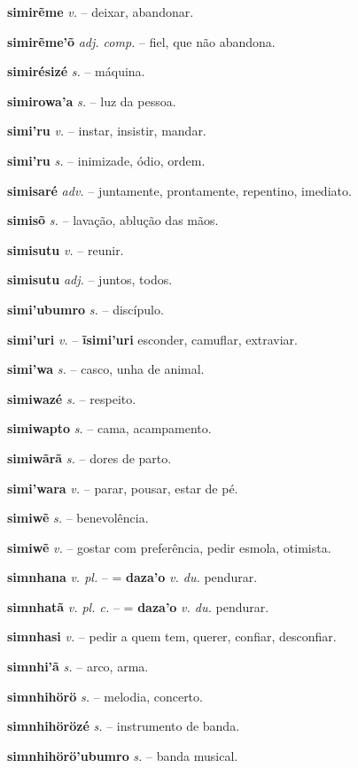 \textbf{simirẽme} \textit{v.} -- deixar, abandonar.

\textbf{simirẽme'õ} \textit{adj. comp.} -- fiel, que não abandona.

\textbf{simirésizé} \textit{s.} -- máquina.

\textbf{simirowa'a} \textit{s.} -- luz da pessoa.

\textbf{simi'ru} \textit{v.} -- instar, insistir, mandar.

\textbf{simi'ru} \textit{s.} -- inimizade, ódio, ordem.

\textbf{simisaré} \textit{adv.} -- juntamente, prontamente, repentino, imediato.

\textbf{simisõ} \textit{s.} -- lavação, ablução das mãos.

\textbf{simisutu} \textit{v.} -- reunir.

\textbf{simisutu} \textit{adj.} -- juntos, todos.

\textbf{simi'ubumro} \textit{s.} -- discípulo.

\textbf{simi'uri} \textit{v.} -- \textbf{ĩsimi'uri} esconder, camuflar, extraviar.

\textbf{simi'wa} \textit{s.} -- casco, unha de animal.

\textbf{simiwazé} \textit{s.} -- respeito.

\textbf{simiwapto} \textit{s.} -- cama, acampamento.

\textbf{simiwãrã} \textit{s.} -- dores de parto.

\textbf{simi'wara} \textit{v.} -- parar, pousar, estar de pé.

\textbf{simiwẽ} \textit{s.} -- benevolência.

\textbf{simiwẽ} \textit{v.} -- gostar com preferência, pedir esmola, otimista.

\textbf{simnhana} \textit{v. pl.} -- = \textbf{daza'o} \textit{v. du.} pendurar.

\textbf{simnhatã} \textit{v. pl. c.} -- = \textbf{daza'o} \textit{v. du.} pendurar.

\textbf{simnhasi} \textit{v.} -- pedir a quem tem, querer, confiar, desconfiar.

\textbf{simnhi'ã} \textit{s.} -- arco, arma.

\textbf{simnhihörö} \textit{s.} -- melodia, concerto.

\textbf{simnhihörözé} \textit{s.} -- instrumento de banda.

\textbf{simnhihörö'ubumro} \textit{s.} -- banda musical.

